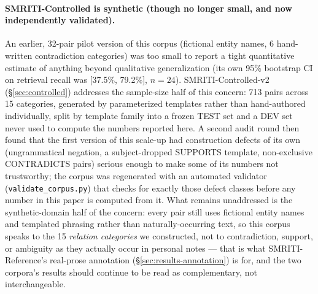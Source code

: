 \paragraph{SMRITI-Controlled is synthetic (though no longer small, and
now independently validated).} An earlier, 32-pair pilot version of this
corpus (fictional entity names, 6 hand-written contradiction categories)
was too small to report a tight quantitative estimate of anything beyond
qualitative generalization (its own 95\% bootstrap CI on retrieval
recall was [37.5\%, 79.2\%], $n=24$). SMRITI-Controlled-v2
(\S\ref{sec:controlled}) addresses the sample-size half of this concern:
713 pairs across 15 categories, generated by parameterized templates
rather than hand-authored individually, split by template family into a
frozen TEST set and a DEV set never used to compute the numbers reported
here. A second audit round then found that the first version of
this scale-up had construction defects of its own (ungrammatical
negation, a subject-dropped SUPPORTS template, non-exclusive
CONTRADICTS pairs) serious enough to make some of its numbers not
trustworthy; the corpus was regenerated with an automated validator
(\texttt{validate\_corpus.py}) that checks for exactly those defect
classes before any number in this paper is computed from it. What
remains unaddressed is the synthetic-domain half of the concern: every
pair still uses fictional entity names and templated phrasing rather than
naturally-occurring text, so this corpus speaks to the 15 \emph{relation
categories} we constructed, not to contradiction, support, or ambiguity
as they actually occur in personal notes --- that is what
SMRITI-Reference's real-prose annotation (\S\ref{sec:results-annotation})
is for, and the two corpora's results should continue to be read as
complementary, not interchangeable.

